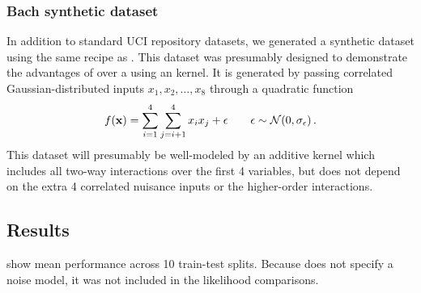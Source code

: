 \subsubsection{Bach synthetic dataset}
In addition to standard UCI repository datasets, we generated a synthetic dataset using the same recipe as \citet{Bach_HKL}.
This dataset was presumably designed to demonstrate the advantages of \HKL{} over a \gp{} using an \seard{} kernel.
It is generated by passing correlated Gaussian-distributed inputs $x_1, x_2, \dots, x_8$ through a quadratic function
%
\begin{align}
f({\bf{x}}) = \sum_{i=1}^4 \sum_{j=i+1}^4 x_i x_j + \epsilon \qquad \epsilon \sim \mathcal{N}\!\left(0,\sigma_\epsilon\right).
\end{align}
%
This dataset will presumably be well-modeled by an additive kernel which includes all two-way interactions over the first 4 variables, but does not depend on the extra 4 correlated nuisance inputs or the higher-order interactions.%

 
 
\subsection{Results}
 show mean performance across 10 train-test splits.
Because \HKL{} does not specify a noise model, it was not included in the likelihood comparisons.

